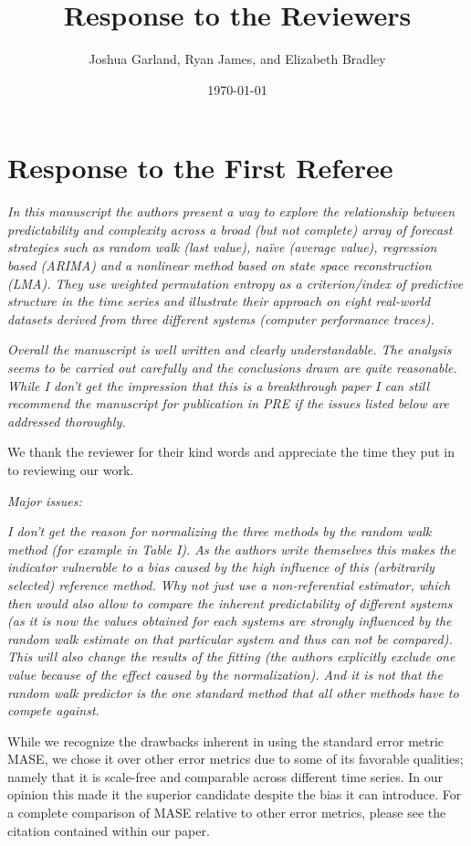 \documentclass[12pt]{article}
\title{Response to the Reviewers}
\author{Joshua Garland, Ryan James, and Elizabeth Bradley}
\date{\today}
\begin{document}
\maketitle

\section*{Response to the First Referee}

\emph{In this manuscript the authors present a way to explore the relationship
between predictability and complexity across a broad (but not complete) array of
forecast strategies such as random walk (last value), na\"ive (average value),
regression based (ARIMA) and a nonlinear method based on state space
reconstruction (LMA). They use weighted permutation entropy as a criterion/index
of predictive structure in the time series and illustrate their approach on
eight real-world datasets derived from three different systems (computer
performance traces).}

\emph{Overall the manuscript is well written and clearly understandable. The
analysis seems to be carried out carefully and the conclusions drawn are quite
reasonable. While I don't get the impression that this is a breakthrough paper I
can still recommend the manuscript for publication in PRE if the issues listed
below are addressed thoroughly.}

We thank the reviewer for their kind words and appreciate the time they put in
to reviewing our work.

\noindent\emph{Major issues:}

\emph{I don't get the reason for normalizing the three methods by the random
walk method (for example in Table I). As the authors write themselves this makes
the indicator vulnerable to a bias caused by the high influence of this
(arbitrarily selected) reference method. Why not just use a non-referential
estimator, which then would also allow to compare the inherent predictability of
different systems (as it is now the values obtained for each systems are
strongly influenced by the random walk estimate on that particular system and
thus can not be compared). This will also change the results of the fitting (the
authors explicitly exclude one value because of the effect caused by the
normalization). And it is not that the random walk predictor is the one standard
method that all other methods have to compete against.}

While we recognize the drawbacks inherent in using the standard error metric
MASE, we chose it over other error metrics due to some of its favorable
qualities; namely that it is scale-free and comparable across different time
series. In our opinion this made it the superior candidate despite the bias it
can introduce. For a complete comparison of MASE relative to other error
metrics, please see the citation contained within our paper.
\end{document}
